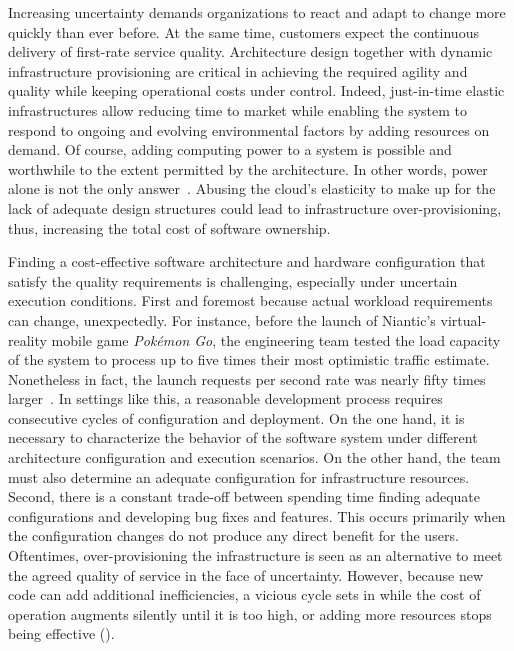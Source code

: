 \label{chapter:architectural-framework}

\minitoc

Increasing uncertainty %
demands organizations to react and adapt to change more quickly than ever before. At the same time, customers expect the continuous delivery of first-rate service quality. Architecture design together with dynamic infrastructure provisioning are critical in achieving the required agility and quality while keeping operational costs under control. Indeed, just-in-time elastic infrastructures allow reducing time to market while enabling the system to respond to ongoing and evolving environmental factors by adding resources on demand. Of course, adding computing power to a system is possible and worthwhile to the extent permitted by the architecture. In other words, power alone is not the only answer~\cite{beyer-2016-site}. Abusing the cloud's elasticity to make up for the lack of adequate design structures could lead to infrastructure over-provisioning, thus, increasing the total cost of software ownership.

Finding a cost-effective software architecture and hardware configuration that satisfy the quality requirements is challenging, especially under uncertain execution conditions. First and foremost because actual workload requirements can change, unexpectedly. For instance, before the launch of Niantic's virtual-reality mobile game \emph{Pok\'{e}mon Go}, the engineering team tested the load capacity of the system to process up to five times their most optimistic traffic estimate. Nonetheless in fact, the launch requests per second rate was nearly fifty times larger~\cite{beyer-2018-site}. In settings like this, a reasonable development process requires consecutive cycles of configuration and deployment. On the one hand, it is necessary to characterize the behavior of the software system under different architecture configuration and execution scenarios. On the other hand, the team must also determine an adequate configuration for infrastructure resources. Second, there is a constant trade-off between spending time finding adequate configurations and developing bug fixes and features. This occurs primarily when the configuration changes do not produce any direct benefit for the users. Oftentimes, over-provisioning the infrastructure is seen as an alternative to meet the agreed quality of service in the face of uncertainty. However, because new code can add additional inefficiencies, a vicious cycle sets in while the cost of operation augments silently until it is too high, or adding more resources stops being effective ().

